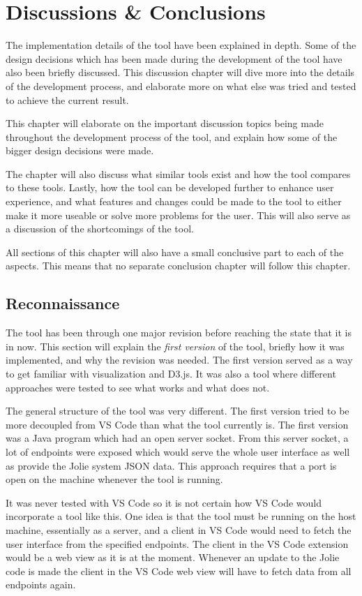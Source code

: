 \chapter{Discussions \& Conclusions}
The implementation details of the tool have been explained in depth. Some of the design decisions which has been made during the development of the tool have also been briefly discussed.
This discussion chapter will dive more into the details of the development process, and elaborate more on what else was tried and tested to achieve the current result.

This chapter will elaborate on the important discussion topics being made throughout the development process of the tool, and explain how
some of the bigger design decisions were made.

The chapter will also discuss what similar tools exist and how the tool compares to these tools. Lastly, how the tool can be developed further to enhance user experience, and what features and changes could be made to the tool to either make it more useable
or solve more problems for the user. This will also serve as a discussion of the shortcomings of the tool.

All sections of this chapter will also have a small conclusive part to each of the aspects. This means that no separate conclusion chapter will follow this chapter.

\section{Reconnaissance}
The tool has been through one major revision before reaching the state that it is in now. This section
will explain the \emph{first version} of the tool, briefly how it was implemented, and why the revision was needed.
The first version served as a way to get familiar with visualization and D3.js. It was also a tool where different approaches were tested to see what works and what does not.

The general structure of the tool was very different. The first version tried to be more decoupled from VS Code than what the tool currently is.
The first version was a Java program which had an open server socket. From this server socket, a lot of endpoints were exposed which would serve the whole user interface as well as provide the Jolie system JSON data.
This approach requires that a port is open on the machine whenever the tool is running.

It was never tested with VS Code so it is not certain how VS Code would incorporate a tool like this. One idea is
that the tool must be running on the host machine, essentially as a server, and a client in VS Code would need to fetch the user interface from the specified endpoints.
The client in the VS Code extension would be a web view as it is at the moment.
Whenever an update to the Jolie code is made the client in the VS Code web view will have to fetch data from all endpoints again.


